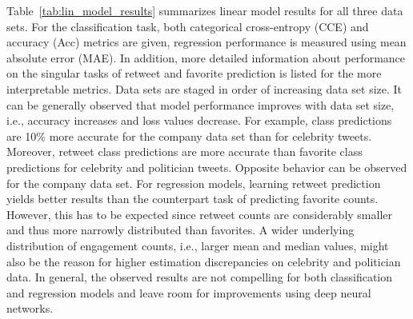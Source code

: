 Table~\ref{tab:lin_model_results} summarizes linear model results for all three
data sets.
For the classification task, both categorical cross-entropy (CCE) and
accuracy (Acc) metrics are given, regression performance is measured using
mean absolute error (MAE).
In addition, more detailed information about performance on the singular tasks of
retweet and favorite prediction is listed for the more interpretable metrics.
Data sets are staged in order of increasing data set size.
It can be generally observed that model performance improves with data set size, i.e.,
accuracy increases and loss values decrease.
For example, class predictions are 10\% more accurate for the company data set
than for celebrity tweets.
Moreover, retweet class predictions are more accurate than favorite class predictions
for celebrity and politician tweets.
Opposite behavior can be observed for the company data set.
For regression models, learning retweet prediction yields better results than
the counterpart task of predicting favorite counts.
However, this has to be expected since retweet counts are considerably smaller
and thus more narrowly distributed than favorites.
A wider underlying distribution of engagement counts, i.e., larger mean and median values, might also be the reason
for higher estimation discrepancies on celebrity and politician data.
In general, the observed results are not compelling for both classification and
regression models and leave room for improvements using deep neural networks.

